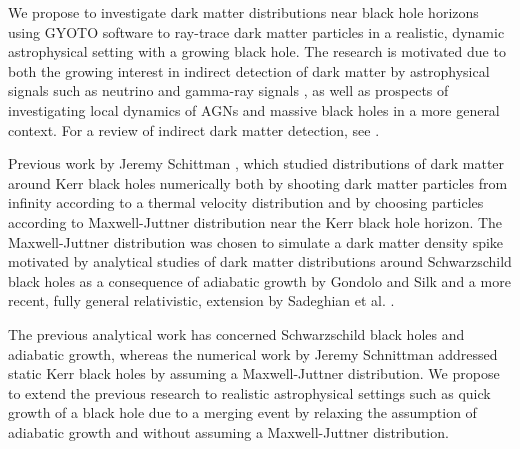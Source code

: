 \documentclass[a4paper,10pt]{article}
\begin{document}

We propose to investigate dark matter distributions near black hole horizons using GYOTO software to ray-trace dark matter 
particles in a realistic, dynamic astrophysical setting with a 
growing black hole. The 
research is motivated due to both the growing interest in indirect 
detection of dark matter by astrophysical signals such as 
neutrino and gamma-ray signals \citep{GS_neutrino_search} 
\citep{indirect_detection_of_dm}, as well as prospects of investigating 
local dynamics of AGNs and massive black holes in a more general 
context. For a review of indirect dark matter detection, see 
\citep{indirect_detection_review}.

Previous work by Jeremy Schittman 
\citep{schnittman2015}, which studied distributions of dark matter 
around Kerr black holes numerically both by shooting dark matter particles 
from infinity according to a thermal velocity distribution and by 
choosing particles according to Maxwell-Juttner distribution near the 
Kerr black hole horizon. The Maxwell-Juttner distribution was 
chosen to simulate a dark matter density spike motivated by analytical 
studies of dark matter distributions around Schwarzschild black holes 
as a consequence of adiabatic growth 
by Gondolo and Silk \citep{GS_2009} 
and a more recent, fully general relativistic, extension by Sadeghian et al. 
\citep{Laleh_GR_DM_distributions}.

The previous analytical work has concerned Schwarzschild black holes 
and adiabatic growth, whereas the numerical work by Jeremy Schnittman 
addressed static Kerr black holes by assuming a Maxwell-Juttner 
distribution.
We propose to extend the previous research to realistic astrophysical 
settings such as quick growth of a black hole due to a merging event by 
relaxing the assumption of adiabatic growth and without assuming a 
Maxwell-Juttner distribution. 
\end{document}
